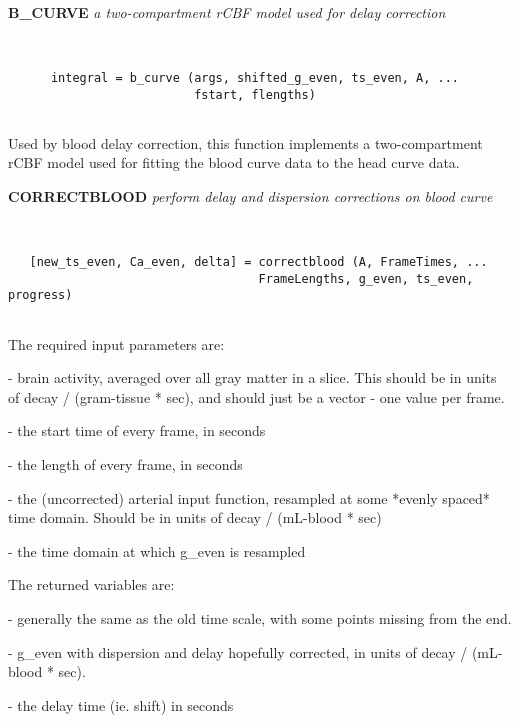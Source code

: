 {\large\bf B\_CURVE} {\em a two-compartment rCBF model used for delay correction}
\begin{verbatim}


      integral = b_curve (args, shifted_g_even, ts_even, A, ... 
                          fstart, flengths)


\end{verbatim}

  Used by blood delay correction, this function implements a
  two-compartment rCBF model used for fitting the blood
  curve data to the head curve data.
\newpage


{\large\bf CORRECTBLOOD} {\em  perform delay and dispersion corrections on blood curve}
\begin{verbatim}


   [new_ts_even, Ca_even, delta] = correctblood (A, FrameTimes, ...
                                   FrameLengths, g_even, ts_even, progress)


\end{verbatim}

   The required input parameters are: 
\begin{description}
\item {} - brain activity, averaged over all gray matter in a slice.  This
           should be in units of decay / (gram-tissue * sec), and should
           just be a vector - one value per frame.
\item {} - the start time of every frame, in seconds
\item {} - the length of every frame, in seconds
\item {} - the (uncorrected) arterial input function, resampled at
                some *evenly spaced* time domain.  Should be in units
                of decay / (mL-blood * sec)
\item {} - the time domain at which g\_even is resampled
\end{description}
 
   The returned variables are:
\begin{description}
\item {} - generally the same as the old time scale,
                     with some points missing from the end.
\item {} - g\_even with dispersion and delay hopefully corrected,
                 in units of decay / (mL-blood * sec).  
\item {} - the delay time (ie. shift) in seconds
\end{description}
 
